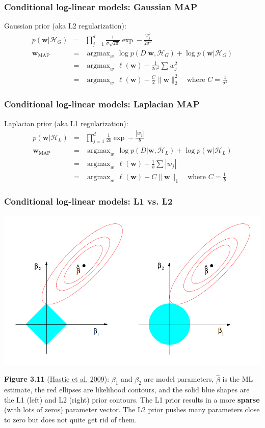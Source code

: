 \documentclass[ignorenonframetext,plain]{beamer}
\DeclareMathOperator*{\argmax}{argmax}
\renewcommand{\vec}{\mathbf}
\begin{document}
\begin{frame}\frametitle{Conditional log-linear models: Gaussian MAP} %
Gaussian prior (aka L2 regularization):\begin{eqnarray*}
p(\vec{w}|\mathcal{H}_G) &=& \prod_{j=1}^d \frac{1}{\sigma \sqrt{2\pi}}
\exp -\frac{w_j^2}{2\sigma^2} \\
\vec{w}_\text{MAP} &=& \argmax_w\, \log p(D|\vec{w},\mathcal{H}_G)
+ \log p(\vec{w}|\mathcal{H}_G) \\
&=& \argmax_w\, \ell(\vec{w}) -\frac{1}{2\sigma^2}\sum w_j^2 \\
&=& \argmax_w\, \ell(\vec{w}) - \frac{C}{2}\|\vec{w}\|_2^2 \quad\text{where }C=\frac{1}{\sigma^2}
\end{eqnarray*}
\end{frame}
\begin{frame}\frametitle{Conditional log-linear models: Laplacian MAP} %
Laplacian prior (aka L1 regularization):\begin{eqnarray*}
p(\vec{w}|\mathcal{H}_L) &=& \prod_{j=1}^d \frac{1}{2b} \exp -\frac{|w_j|}{b}\\
\vec{w}_\text{MAP} &=& \argmax_w\, \log p(D|\vec{w},\mathcal{H}_L)
+ \log p(\vec{w}|\mathcal{H}_L) \\
&=& \argmax_w\, \ell(\vec{w}) -\frac{1}{b}\sum |w_j| \\
&=& \argmax_w\, \ell(\vec{w}) - C \|\vec{w}\|_1 \quad\text{where }C=\frac{1}{b}
\end{eqnarray*}
\end{frame}

\begin{frame}\frametitle{Conditional log-linear models: L1 vs. L2} %
\includegraphics[width=.9\textwidth]{images/hastie-fig-3-11.png}

\footnotesize {\bf Figure 3.11}
(\href{http://www-stat.stanford.edu/~tibs/ElemStatLearn}{Hastie et
  al. 2009}): $\beta_1$ and $\beta_2$ are model parameters,
$\hat{\beta}$ is the ML estimate, the red ellipses are likelihood
contours, and the solid blue shapes are the L1 (left) and L2 (right)
prior contours.  The L1 prior results in a more {\bf sparse} (with
lots of zeros) parameter vector.  The L2 prior pushes many parameters
close to zero but does not quite get rid of them.
\end{frame}
\end{document}
